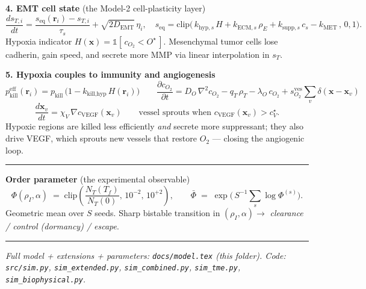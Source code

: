\documentclass[11pt,letterpaper]{article}
\begin{document}
\textbf{4. EMT cell state} (the Model-2 cell-plasticity layer)
\begin{equation*}
\frac{d s_{T,i}}{dt} = \frac{s_{\text{eq}}(\mathbf{r}_i) - s_{T,i}}{\tau_s} + \sqrt{2 D_{\text{EMT}}}\,\eta_i,
\quad
s_{\text{eq}} = \mathrm{clip}\!\big(\,k_{\text{hyp},s}\,H + k_{\text{ECM},s}\,\rho_E + k_{\text{supp},s}\,c_s - k_{\text{MET}}\,,\,0,1\big).
\end{equation*}
Hypoxia indicator $H(\mathbf{x}) = \mathbb{1}[\,c_{O_2} < O^\star\,]$. Mesenchymal tumor cells lose cadherin, gain speed, and secrete more MMP via linear interpolation in $s_T$.

\textbf{5. Hypoxia couples to immunity and angiogenesis}
\begin{equation*}
p_{\text{kill}}^{\text{eff}}(\mathbf{r}_i) = p_{\text{kill}}\,
   \big(1 - k_{\text{kill,hyp}}\,H(\mathbf{r}_i)\big)
\qquad
\frac{\partial c_{O_2}}{\partial t}
  = D_O\,\nabla^2 c_{O_2} - q_T\,\rho_T - \lambda_O\,c_{O_2}
  + s_{O_2}^{\text{ves}}\!\!\sum_v \delta(\mathbf{x}-\mathbf{x}_v)
\end{equation*}
\begin{equation*}
\frac{d\mathbf{x}_v}{dt} = \chi_V\,\nabla c_{\text{VEGF}}(\mathbf{x}_v)
\qquad
\text{vessel sprouts when } c_{\text{VEGF}}(\mathbf{x}_v) > c_V^\star.
\end{equation*}
Hypoxic regions are killed less efficiently \emph{and} secrete more suppressant; they also drive VEGF, which sprouts new vessels that restore $O_2$ --- closing the angiogenic loop.

\smallskip
\hrule
\smallskip

\textbf{Order parameter} (the experimental observable)
\begin{equation*}
\Phi(\rho_I, \alpha) \;=\; \mathrm{clip}\!\left(\frac{N_T(T_f)}{N_T(0)},\,10^{-2},\,10^{+2}\right),
\qquad
\bar\Phi \;=\; \exp\!\Big(\,S^{-1}\textstyle\sum_s \log \Phi^{(s)}\Big).
\end{equation*}
Geometric mean over $S$ seeds. Sharp bistable transition in $(\rho_I, \alpha) \to$ \emph{clearance / control (dormancy) / escape}.

\vspace{0.4em}
\hrule
\vspace{0.4em}

{\small\itshape Full model + extensions + parameters: \texttt{docs/model.tex} (this folder). Code: \texttt{src/sim.py}, \texttt{sim\_extended.py}, \texttt{sim\_combined.py}, \texttt{sim\_tme.py}, \texttt{sim\_biophysical.py}.}
\end{document}

